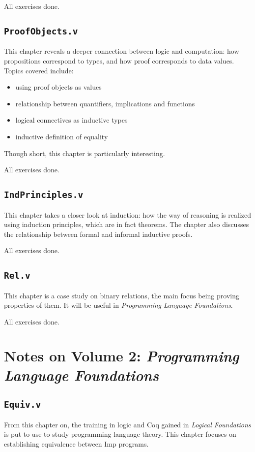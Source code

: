 \documentclass[screen,sigplan]{acmart}\settopmatter{printfolios=true,printccs=false,printacmref=false}
\begin{document}
All exercises done.


\subsection{\texttt{ProofObjects.v}}
This chapter reveals a deeper connection between logic and computation: how propositions correspond
to types, and how proof corresponds to data values. Topics covered include:
\begin{itemize}
  \item using proof objects as values
  \item relationship between quantifiers, implications and functions
  \item logical connectives as inductive types
  \item inductive definition of equality
\end{itemize}
Though short, this chapter is particularly interesting.

All exercises done.


\subsection{\texttt{IndPrinciples.v}}
This chapter takes a closer look at induction: how the way of reasoning is realized using
induction principles, which are in fact theorems. The chapter also discusses the relationship between
formal and informal inductive proofs.

All exercises done.


\subsection{\texttt{Rel.v}}
This chapter is a case study on binary relations, the main focus being proving properties
of them. It will be useful in \emph{Programming Language Foundations}.

All exercises done.


\section{Notes on Volume 2: \emph{Programming Language Foundations}}

\subsection{\texttt{Equiv.v}}
From this chapter on, the training in logic and Coq gained in \emph{Logical Foundations}
is put to use to study programming language theory. This chapter focuses on establishing
equivalence between Imp programs.
\end{document}
